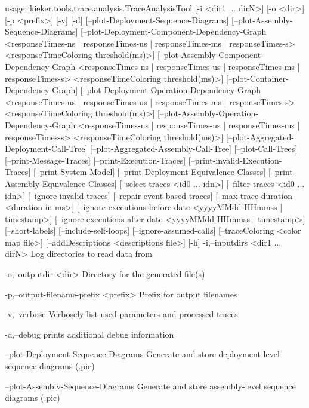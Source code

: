 usage: kieker.tools.trace.analysis.TraceAnalysisTool [-i <dir1 ... dirN>]
       [-o <dir>] [-p <prefix>] [-v] [-d]
       [--plot-Deployment-Sequence-Diagrams]
       [--plot-Assembly-Sequence-Diagrams]
       [--plot-Deployment-Component-Dependency-Graph <responseTimes-ns |
       responseTimes-us | responseTimes-ms | responseTimes-s>
       <responseTimeColoring threshold(ms)>]
       [--plot-Assembly-Component-Dependency-Graph <responseTimes-ns |
       responseTimes-us | responseTimes-ms | responseTimes-s>
       <responseTimeColoring threshold(ms)>]
       [--plot-Container-Dependency-Graph]
       [--plot-Deployment-Operation-Dependency-Graph <responseTimes-ns |
       responseTimes-us | responseTimes-ms | responseTimes-s>
       <responseTimeColoring threshold(ms)>]
       [--plot-Assembly-Operation-Dependency-Graph <responseTimes-ns |
       responseTimes-us | responseTimes-ms | responseTimes-s>
       <responseTimeColoring threshold(ms)>]
       [--plot-Aggregated-Deployment-Call-Tree]
       [--plot-Aggregated-Assembly-Call-Tree] [--plot-Call-Trees]
       [--print-Message-Traces] [--print-Execution-Traces]
       [--print-invalid-Execution-Traces] [--print-System-Model]
       [--print-Deployment-Equivalence-Classes]
       [--print-Assembly-Equivalence-Classes] [--select-traces <id0 ...
       idn>] [--filter-traces <id0 ... idn>] [--ignore-invalid-traces]
       [--repair-event-based-traces] [--max-trace-duration <duration in
       ms>] [--ignore-executions-before-date <yyyyMMdd-HHmmss |
       timestamp>] [--ignore-executions-after-date <yyyyMMdd-HHmmss |
       timestamp>] [--short-labels] [--include-self-loops]
       [--ignore-assumed-calls] [--traceColoring <color map file>]
       [--addDescriptions <descriptions file>] [-h]
 -i,--inputdirs <dir1 ... dirN>
        Log directories to read data from

 -o,--outputdir <dir>
        Directory for the generated file(s)

 -p,--output-filename-prefix <prefix>
        Prefix for output filenames
        

 -v,--verbose
        Verbosely list used parameters and processed traces

 -d,--debug
        prints additional debug information

    --plot-Deployment-Sequence-Diagrams
        Generate and store deployment-level sequence diagrams (.pic)

    --plot-Assembly-Sequence-Diagrams
        Generate and store assembly-level sequence diagrams (.pic)


